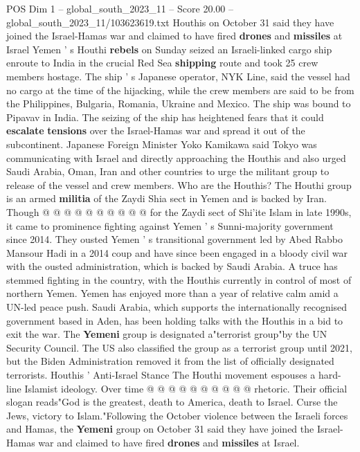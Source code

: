 \begin{textsample}{POS Dim 1 – global\_south\_2023\_11 – Score 20.00 – global\_south\_2023\_11/103623619.txt}  \label{ex:f1_pos_225}
Houthis on October 31 said they have joined the Israel-Hamas war and claimed to have fired \textbf{drones} and \textbf{missiles} at Israel Yemen ' s Houthi \textbf{rebels} on Sunday seized an Israeli-linked cargo ship enroute to India in the crucial Red Sea \textbf{shipping} route and took 25 crew members hostage.
The ship ' s Japanese operator, NYK Line, said the vessel had no cargo at the time of the hijacking, while the crew members are said to be from the Philippines, Bulgaria, Romania, Ukraine and Mexico.
The ship was bound to Pipavav in India.
The seizing of the ship has heightened fears that it could \textbf{escalate} \textbf{tensions} over the Israel-Hamas war and spread it out of the subcontinent.
Japanese Foreign Minister Yoko Kamikawa said Tokyo was communicating with Israel and directly approaching the Houthis and also urged Saudi Arabia, Oman, Iran and other countries to urge the militant group to release of the vessel and crew members.
Who are the Houthis?
The Houthi group is an armed \textbf{militia} of the Zaydi Shia sect in Yemen and is backed by Iran.
Though @ @ @ @ @ @ @ @ @ @ for the Zaydi sect of Shi'ite Islam in late 1990s, it came to prominence fighting against Yemen ' s Sunni-majority government since 2014.
They ousted Yemen ' s transitional government led by Abed Rabbo Mansour Hadi in a 2014 coup and have since been engaged in a bloody civil war with the ousted administration, which is backed by Saudi Arabia.
A truce has stemmed fighting in the country, with the Houthis currently in control of most of northern Yemen.
Yemen has enjoyed more than a year of relative calm amid a UN-led peace push.
Saudi Arabia, which supports the internationally recognised government based in Aden, has been holding talks with the Houthis in a bid to exit the war.
The \textbf{Yemeni} group is designated a"terrorist group"by the UN Security Council.
The US also classified the group as a terrorist group until 2021, but the Biden Administration removed it from the list of officially designated terrorists.
Houthis ' Anti-Israel Stance The Houthi movement espouses a hard-line Islamist ideology.
Over time @ @ @ @ @ @ @ @ @ @ rhetoric.
Their official slogan reads"God is the greatest, death to America, death to Israel.
Curse the Jews, victory to Islam."Following the October violence between the Israeli forces and Hamas, the \textbf{Yemeni} group on October 31 said they have joined the Israel-Hamas war and claimed to have fired \textbf{drones} and \textbf{missiles} at Israel.

\end{textsample}
